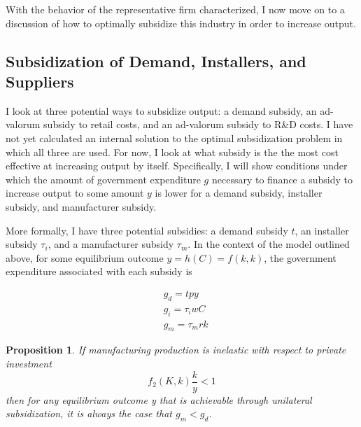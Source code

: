 \documentclass{article}
\newtheorem{proposition}{Proposition}
\begin{document}
With the behavior of the representative firm characterized, I now move on to a discussion of how to optimally subsidize this industry in order to increase output.

\subsection{Subsidization of Demand, Installers, and Suppliers}

I look at three potential ways to subsidize output: a demand subsidy, an ad-valorum subsidy to retail costs, and an ad-valorum subsidy to R\&D costs. I have not yet calculated an internal solution to the optimal subsidization problem in which all three are used. For now, I look at what subsidy is the the most cost effective at increasing output by itself. Specifically, I will show conditions under which the amount of government expenditure $g$ necessary to finance a subsidy to increase output to some amount $y$ is lower for a demand subsidy, installer subsidy, and manufacturer subsidy.

More formally, I have three potential subsidies: a demand subsidy $t$, an installer subsidy $\tau_i$, and a manufacturer subsidy $\tau_m$. In the context of the model outlined above, for some equilibrium outcome $y = h(C) = f(k,k)$, the government expenditure associated with each subsidy is

\begin{align}
&g_d = tpy \\
&g_{i} = \tau_i w C \\
&g_{m} = \tau_m r k 
\end{align}

\begin{proposition}
If manufacturing production is inelastic with respect to private investment
\[
f_2(K,k) \frac{k}{y}  <  1
\]
then for any equilibrium outcome y that is achievable through unilateral subsidization, it is always the case that $g_m < g_d$.
\end{proposition}
\end{document}
